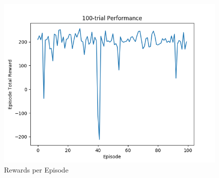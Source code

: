 \begin{figure}%
\centering
\includegraphics[width=0.6\columnwidth]{figures/evaluate_100.png}%
\caption{Rewards per Episode}%
\label{fig:datastats}%
\end{figure}


